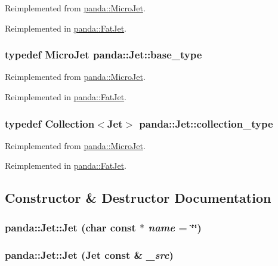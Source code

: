 Reimplemented from \hyperlink{classpanda_1_1MicroJet_ac1892a7cfd937c8967fce27bcff9cdc7}{panda::MicroJet}.

Reimplemented in \hyperlink{classpanda_1_1FatJet_af8c5781a44a91eb012c01dde2a710039}{panda::FatJet}.\hypertarget{classpanda_1_1Jet_a4fbfc283916dbd345b13a61396b878cf}{
\subsubsection[{base\_\-type}]{\setlength{\rightskip}{0pt plus 5cm}typedef {\bf MicroJet} {\bf panda::Jet::base\_\-type}}}
\label{classpanda_1_1Jet_a4fbfc283916dbd345b13a61396b878cf}


Reimplemented from \hyperlink{classpanda_1_1MicroJet_a2d604c4fa862edcde48e188002052ece}{panda::MicroJet}.

Reimplemented in \hyperlink{classpanda_1_1FatJet_ab06dcce3d9c117c93a036c87fb441795}{panda::FatJet}.\hypertarget{classpanda_1_1Jet_abc4f1b55581c1f9a65d14ca360458c40}{
\subsubsection[{collection\_\-type}]{\setlength{\rightskip}{0pt plus 5cm}typedef {\bf Collection}$<${\bf Jet}$>$ {\bf panda::Jet::collection\_\-type}}}
\label{classpanda_1_1Jet_abc4f1b55581c1f9a65d14ca360458c40}


Reimplemented from \hyperlink{classpanda_1_1MicroJet_a07385bfbc6560036a2f568b073183df9}{panda::MicroJet}.

Reimplemented in \hyperlink{classpanda_1_1FatJet_a2740a440685d1d581f92bcedbf1a6f9e}{panda::FatJet}.

\subsection{Constructor \& Destructor Documentation}
\hypertarget{classpanda_1_1Jet_a68b4c3afba44d3b71bb2d4c9b015869f}{
\subsubsection[{Jet}]{\setlength{\rightskip}{0pt plus 5cm}panda::Jet::Jet (char const $\ast$ {\em name} = {\ttfamily \char`\"{}\char`\"{}})}}
\label{classpanda_1_1Jet_a68b4c3afba44d3b71bb2d4c9b015869f}
\hypertarget{classpanda_1_1Jet_acf20ecedd6baf62791de5d0d8c63a996}{
\subsubsection[{Jet}]{\setlength{\rightskip}{0pt plus 5cm}panda::Jet::Jet ({\bf Jet} const \& {\em \_\-src})}}
\label{classpanda_1_1Jet_acf20ecedd6baf62791de5d0d8c63a996}



